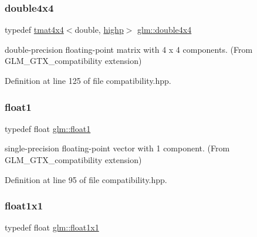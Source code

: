 \subsubsection{\texorpdfstring{double4x4}{double4x4}}
{\footnotesize\ttfamily typedef \mbox{\hyperlink{structglm_1_1tmat4x4}{tmat4x4}}$<$double, \mbox{\hyperlink{namespaceglm_a0f04f086094c747d227af4425893f545ac6f7eab42eacbb10d59a58e95e362074}{highp}}$>$ \mbox{\hyperlink{group__gtx__compatibility_ga83ac0f28025f5e999b03094400fbddcb}{glm\+::double4x4}}}



double-\/precision floating-\/point matrix with 4 x 4 components. (From G\+L\+M\+\_\+\+G\+T\+X\+\_\+compatibility extension) 



Definition at line 125 of file compatibility.\+hpp.

\mbox{\label{group__gtx__compatibility_gae0ad1b0450320cda98bbbecb56bc3167}} 
\subsubsection{\texorpdfstring{float1}{float1}}
{\footnotesize\ttfamily typedef float \mbox{\hyperlink{group__gtx__compatibility_gae0ad1b0450320cda98bbbecb56bc3167}{glm\+::float1}}}



single-\/precision floating-\/point vector with 1 component. (From G\+L\+M\+\_\+\+G\+T\+X\+\_\+compatibility extension) 



Definition at line 95 of file compatibility.\+hpp.

\mbox{\label{group__gtx__compatibility_gaac1faa940ac1fbb32d4a315005b578af}} 
\subsubsection{\texorpdfstring{float1x1}{float1x1}}
{\footnotesize\ttfamily typedef float \mbox{\hyperlink{group__gtx__compatibility_gaac1faa940ac1fbb32d4a315005b578af}{glm\+::float1x1}}}



